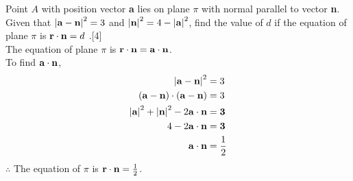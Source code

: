 \documentclass[12pt, a4 paper]{article}
\begin{document}
\begin{outline}[enumerate]
					\color{black}
					\1 Point $A$ with position vector \textbf{a} lies on plane $\pi $ with normal parallel to vector \textbf{n}. Given that ${\left| {{\bf{a}} - {\bf{n}}} \right|^2} = 3$ and ${\left| {\bf{n}} \right|^2} = 4 - {\left| {\bf{a}} \right|^2}$, find the value of $d$ if the equation of plane $\pi $ is ${\bf{r}} \cdot {\bf{n}} = d$
					.\hfill[4]
					\color{blue}
					\\{\textrm{The equation of plane }}$\pi$ {\textrm{ is }}${\bf{r}} \cdot {\bf{n}} = {\bf{a}} \cdot {\bf{n}}$.
					\\To find ${\bf{a}} \cdot {\bf{n}}$,
					\begin{align*}
						{\left| {{\bf{a}} - {\bf{n}}} \right|^2} & = 3 \\({\bf{a}} - {\bf{n}}) \cdot ({\bf{a}} - {\bf{n}}) &= 3\\{\left| {\bf{a}} \right|^2} + {\left| {\bf{n}} \right|^2} - 2{\bf{a}} \cdot {\bf{n}} &= {\bf{3}}\\4 - 2{\bf{a}} \cdot {\bf{n}} &= {\bf{3}}\\{\bf{a}} \cdot {\bf{n}} &= \frac{1}{2}
						\\
					\end{align*}
					$\therefore$ {\textrm{The equation of }}$\pi$ {\textrm{ is }}${\bf{r}} \cdot {\bf{n}} = \frac{1}{2}$.

					\color{black}


\end{outline}
\end{document}
